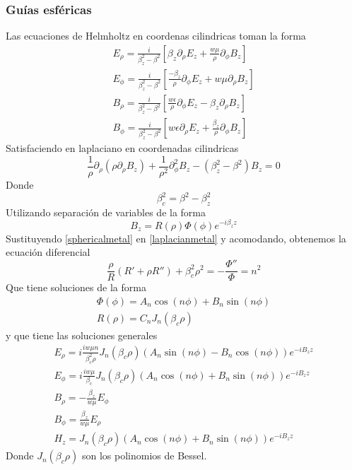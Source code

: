 \subsubsection{Guías esféricas}
Las ecuaciones de Helmholtz en coordenas cilindricas toman la forma
\begin{eqnarray}
	E_{\rho}=\frac{i}{\beta^2_{z}-\beta^2} \left[ \beta_{z} \partial_{\rho} E_{z}+ \frac{w \mu}{\rho}\partial_{\phi}B_{z} \right] \\
		E_{\phi}=\frac{i}{\beta^2_{z}-\beta^2} \left[ \frac{-\beta_{z}}{\rho} \partial_{\phi} E_{z}+ w \mu\partial_{\rho}B_{z} \right] \\
B_{\rho}=\frac{i}{\beta^2_{z}-\beta^2} \left[ \frac{w \epsilon}{\rho} \partial_{\phi} E_{z}- \beta_{z} \partial_{\rho}B_{z} \right] \\
B_{\phi}=\frac{i}{\beta^2_{z}-\beta^2} \left[ w \epsilon \partial_{\rho} E_{z}+ \frac{\beta_{z}}{\rho} \partial_{\phi}B_{z} \right] 	
\end{eqnarray}
Satisfaciendo en laplaciano en coordenadas cilindricas
\begin{equation}\label{laplacianmetal}
\frac{1}{\rho}\partial_{\rho}(\rho \partial_{\rho} B_{z}) + \frac{1}{\rho^2} \partial_{\phi}^2 B_{z}-(\beta_{z}^2-\beta^2)B_{z}=0
\end{equation}
Donde
\begin{equation}
	\beta_{c}^2=\beta^2-\beta_{z}^2
\end{equation}
Utilizando separación de variables de la forma
\begin{equation}\label{sphericalmetal}
B_{z}=R(\rho)\Phi(\phi)e^{-i\beta_{z}z}
\end{equation}
Sustituyendo \ref{sphericalmetal} en \ref{laplacianmetal} y acomodando, obtenemos la ecuación diferencial
\begin{equation}
\frac{\rho}{R}(R'+\rho R'')+\beta_{c}^2\rho^2=-\frac{\Phi''}{\Phi}=n^2
\end{equation} 
Que tiene soluciones de la forma
\begin{eqnarray}
\Phi(\phi)=A_{n}\cos(n\phi)+B_{n}\sin(n\phi) \\
R(\rho)=C_{n}J_{n}(\beta_{c}\rho)
\end{eqnarray}
y que tiene las soluciones generales
\begin{eqnarray}
	E_{\rho}=i\frac{i w \mu n}{\beta_{c}^2\rho}J_{n}(\beta_{c}\rho)(A_{n}\sin(n\phi)-B_{n}\cos(n \phi))e^{-iB_{z}z} \\
	E_{\phi}=i\frac{i w \mu }{\beta_{c}}J_{n}(\beta_{c}\rho)(A_{n}\cos(n\phi)+B_{n}\sin(n \phi))e^{-iB_{z}z}\\
	B_{\rho}=-\frac{\beta_{z}}{w\mu}E_{\phi}\\
	B_{\phi}=\frac{\beta_{z}}{w\mu}E_{\rho}\\
	H_{z}=J_{n}(\beta_{c}\rho)(A_{n}\cos(n\phi)+B_{n}\sin(n \phi))e^{-iB_{z}z}
\end{eqnarray}
Donde $J_{n}(\beta_{c}\rho)$ son los polinomios de Bessel.
